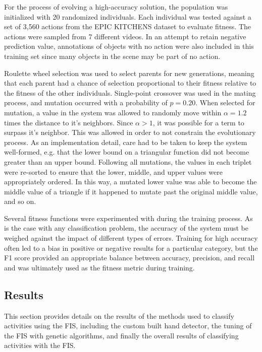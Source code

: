 \documentclass[12pt]{report}
\begin{document}
For the process of evolving a high-accuracy solution, the population was initialized with 20 randomized individuals. Each individual was tested against a set of 3,560 actions from the EPIC KITCHENS dataset to evaluate fitness. The actions were sampled from 7 different videos. In an attempt to retain negative prediction value, annotations of objects with no action were also included in this training set since many objects in the scene may be part of no action.

Roulette wheel selection was used to select parents for new generations, meaning that each parent had a chance of selection proportional to their fitness relative to the fitness of the other individuals. Single-point crossover was used in the mating process, and mutation occurred with a probability of $p=0.20$. When selected for mutation, a value in the system was allowed to randomly move within $\alpha=1.2$ times the distance to it's neighbors. Since $\alpha > 1$, it was possible for a term to surpass it's neighbor. This was allowed in order to not constrain the evolutionary process. As an implementation detail, care had to be taken to keep the system well-formed, e.g. that the lower bound on a triangular function did not become greater than an upper bound. Following all mutations, the values in each triplet were re-sorted to ensure that the lower, middle, and upper values were appropriately ordered. In this way, a mutated lower value was able to become the middle value of a triangle if it happened to mutate past the original middle value, and so on.

Several fitness functions were experimented with during the training process. As is the case with any classification problem, the accuracy of the system must be weighed against the impact of different types of errors. Training for high accuracy often led to a bias in positive or negative results for a particular category, but the F1 score provided an appropriate balance between accuracy, precision, and recall and was ultimately used as the fitness metric during training.

\subsection{Results}
This section provides details on the results of the methods used to classify activities using the FIS, including the custom built hand detector, the tuning of the FIS with genetic algorithms, and finally the overall results of classifying activities with the FIS.
\end{document}
